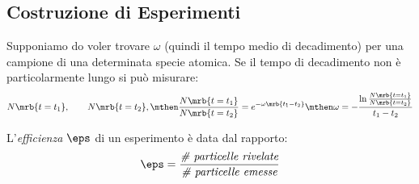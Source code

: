 \subsection{Costruzione di Esperimenti}
Supponiamo do voler trovare $\omega$ (quindi il tempo medio di decadimento) per
una campione di una determinata specie atomica. Se il tempo di decadimento non
è particolarmente lungo si può misurare:
\begin{equation}
  N \mrb{t = t_1},
  \qquad
  N \mrb{t = t_2},
  \mthen
  \frac{N \mrb{t = t_1}}{N \mrb{t = t_2}} = e^{-\omega \mrb{t_1 - t_2}}
  \mthen
  \omega = - \frac{\ln \frac{N \mrb{t = t_1}}{N \mrb{t = t_2}}}{t_1 - t_2}
\end{equation}

L'\textit{efficienza} $\eps$ di un esperimento è data dal rapporto:
\begin{equation}
  \eps = \frac{\textit{\# particelle rivelate}}{\textit{\# particelle emesse}}
\end{equation}
